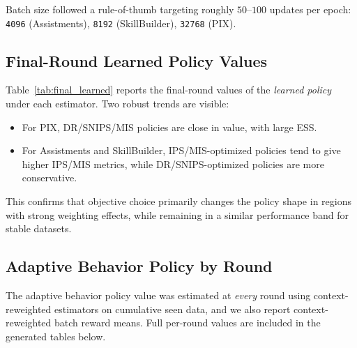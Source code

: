 \documentclass[11pt]{article}
\begin{document}
Batch size followed a rule-of-thumb targeting roughly $50$--$100$ updates per epoch:
\texttt{4096} (Assistments), \texttt{8192} (SkillBuilder), \texttt{32768} (PIX).

\subsection{Final-Round Learned Policy Values}
Table~\ref{tab:final_learned} reports the final-round values of the \emph{learned policy}
under each estimator. Two robust trends are visible:
\begin{itemize}
  \item For PIX, DR/SNIPS/MIS policies are close in value, with large ESS.
  \item For Assistments and SkillBuilder, IPS/MIS-optimized policies tend to give
  higher IPS/MIS metrics, while DR/SNIPS-optimized policies are more conservative.
\end{itemize}
This confirms that objective choice primarily changes the policy shape in regions with
strong weighting effects, while remaining in a similar performance band for stable datasets.

\begin{table}[htbp]
\centering
\small
\caption{Final-round learned policy values across datasets/objectives (ESS in thousands).}
\label{tab:final_learned}

\end{table}

\subsection{Adaptive Behavior Policy by Round}
The adaptive behavior policy value was estimated at \emph{every} round using
context-reweighted estimators on cumulative seen data, and we also report
context-reweighted batch reward means. Full per-round values are included in
the generated tables below.

\begin{table}[p]
\centering
\scriptsize
\caption{Assistments: behavior policy values by round (context-reweighted).}
\label{tab:beh_round_assistments}

\end{table}

\begin{table}[p]
\centering
\scriptsize
\caption{SkillBuilder: behavior policy values by round (context-reweighted).}
\label{tab:beh_round_skillbuilder}

\end{table}
\end{document}
